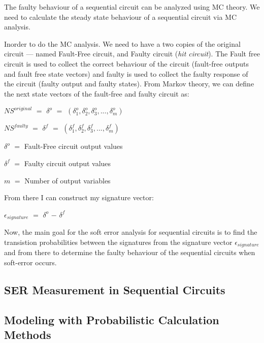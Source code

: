 The faulty behaviour of a sequential circuit can be analyzed using MC theory. We need to calculate the steady state behaviour of a sequential circuit via MC analysis. 

Inorder to do the MC analysis. We need to have a two copies of the original circuit --- named Fault-Free circuit, and Faulty circuit (\textit{hit circuit}). The Fault free circuit is used to collect the correct behaviour of the circuit (fault-free outputs and fault free state vectors) and faulty is used to collect the faulty response of the circuit (faulty output and faulty states). From Markov theory, we can define the next state vectors of the fault-free and faulty circuit as:




$NS^{original}$ $=$  $\delta^{o}$ $=$ $(\delta^{o}_{1},\delta^{o}_{2},\delta^{o}_{3},...,\delta^{o}_{m})$


$NS^{faulty}$ $=$  $\delta^{f}$ $=$ $(\delta^{f}_{1},\delta^{f}_{2},\delta^{f}_{3},...,\delta^{f}_{m})$


$\delta^{o}$ $=$ Fault-Free circuit output values

$\delta^{f}$ $=$ Faulty circuit output values

$m$ $=$ Number of output variables

From there I can construct my signature vector:


$\epsilon_{signature}$ $=$ $\delta^{o}$  $-$ $\delta^{f}$


Now, the main goal for the soft error analysis for sequential circuits is to find the transistion probabilities between the signatures from the signature vector $\epsilon_{signature}$ and from there to determine the faulty behaviour of the sequential circuits when soft-error occurs. 

\subsection{SER Measurement in Sequential Circuits}

\subsection{Modeling with Probabilistic Calculation Methods}




